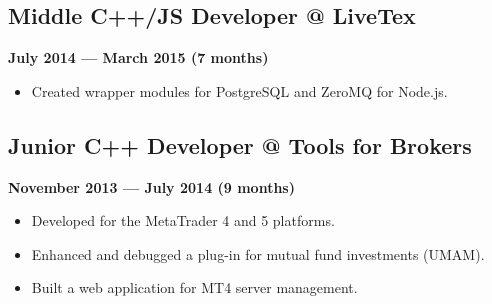 \documentclass[a4paper,12pt]{article}
\begin{document}
\subsection*{Middle C++/JS Developer @ LiveTex}
\textbf{July 2014 — March 2015 (7 months)}
\begin{itemize}
    \item Created wrapper modules for PostgreSQL and ZeroMQ for Node.js.
\end{itemize}

\subsection*{Junior C++ Developer @ Tools for Brokers}
\textbf{November 2013 — July 2014 (9 months)}
\begin{itemize}
    \item Developed for the MetaTrader 4 and 5 platforms.
    \item Enhanced and debugged a plug-in for mutual fund investments (UMAM).
    \item Built a web application for MT4 server management.
\end{itemize}
\end{document}
